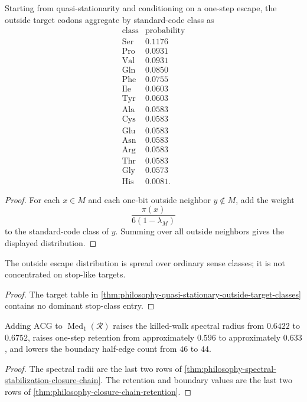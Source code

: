\begin{theorem}
\label{thm:philosophy-quasi-stationary-outside-target-classes}
Starting from quasi-stationarity and conditioning on a one-step escape,
the outside target codons aggregate by standard-code class as
$$
\begin{array}{c|r}
  \text{class} & \text{probability}\\
  \hline
  \mathrm{Ser} & 0.1176\\
  \mathrm{Pro} & 0.0931\\
  \mathrm{Val} & 0.0931\\
  \mathrm{Gln} & 0.0850\\
  \mathrm{Phe} & 0.0755\\
  \mathrm{Ile} & 0.0603\\
  \mathrm{Tyr} & 0.0603\\
  \mathrm{Ala} & 0.0583\\
  \mathrm{Cys} & 0.0583\\
  \mathrm{Glu} & 0.0583\\
  \mathrm{Asn} & 0.0583\\
  \mathrm{Arg} & 0.0583\\
  \mathrm{Thr} & 0.0583\\
  \mathrm{Gly} & 0.0573\\
  \mathrm{His} & 0.0081.
\end{array}
$$
\end{theorem}
\begin{proof}
For each $x\in M$ and each one-bit outside neighbor $y\notin M$, add
the weight
$$
  \frac{\pi(x)}{6(1-\lambda_M)}
$$
to the standard-code class of $y$. Summing over all outside neighbors
gives the displayed distribution.
\end{proof}

\begin{corollary}
\label{cor:philosophy-sense-class-escape-boundary}
The outside escape distribution is spread over ordinary sense classes;
it is not concentrated on stop-like targets.
\end{corollary}
\begin{proof}
The target table in
\autoref{thm:philosophy-quasi-stationary-outside-target-classes}
contains no dominant stop-class entry.
\end{proof}

\begin{theorem}
\label{thm:philosophy-acg-spectral-sealing-corner}
Adding $\mathrm{ACG}$ to $\operatorname{Med}_{1}(\mathcal{R})$ raises
the killed-walk spectral radius from $0.6422$ to $0.6752$, raises
one-step retention from approximately $0.596$ to approximately $0.633$,
and lowers the boundary half-edge count from $46$ to $44$.
\end{theorem}
\begin{proof}
The spectral radii are the last two rows of
\autoref{thm:philosophy-spectral-stabilization-closure-chain}. The
retention and boundary values are the last two rows of
\autoref{thm:philosophy-closure-chain-retention}.
\end{proof}

